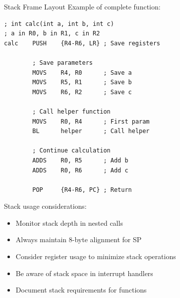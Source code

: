\begin{example2}{Stack Frame Layout}
Example of complete function:
\begin{lstlisting}[language=armasm, style=basesmol]
; int calc(int a, int b, int c)
; a in R0, b in R1, c in R2
calc    PUSH    {R4-R6, LR} ; Save registers
        
        ; Save parameters
        MOVS    R4, R0      ; Save a
        MOVS    R5, R1      ; Save b
        MOVS    R6, R2      ; Save c
        
        ; Call helper function
        MOVS    R0, R4      ; First param
        BL      helper      ; Call helper
        
        ; Continue calculation
        ADDS    R0, R5      ; Add b
        ADDS    R0, R6      ; Add c
        
        POP     {R4-R6, PC} ; Return
\end{lstlisting}
\end{example2}

\begin{remark}
Stack usage considerations:
\begin{itemize}
  \item Monitor stack depth in nested calls
  \item Always maintain 8-byte alignment for SP
  \item Consider register usage to minimize stack operations
  \item Be aware of stack space in interrupt handlers
  \item Document stack requirements for functions
\end{itemize}
\end{remark}

